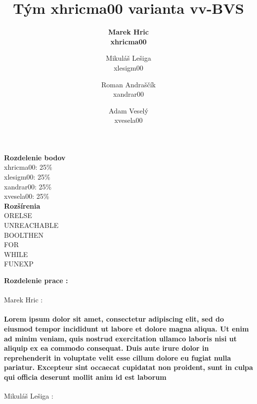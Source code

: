 \documentclass[12pt]{article}
\begin{document}
 
 
\title{\Huge \textbf{Tým xhricma00 varianta vv-BVS}}

\author{\bf Marek Hric \\
\bf xhricma00
\and Mikuláš Lešiga\\
 xlesigm00
\and Roman Andraščík \\
 xandrar00
\and Adam Veselý \\ 
xvesela00
}

\maketitle
\bigskip
\begin{center}
 \Large \textbf{Rozdelenie bodov}  \normalsize
 \\ 
\medskip
xhricma00: 25\% \\
xlesigm00: 25\% \\
xandrar00: 25\% \\
xvesela00: 25\%  \\
\bigskip
 \Large \textbf{Rozšírenia} \normalsize
\\
\medskip
ORELSE\\
UNREACHABLE\\
BOOLTHEN\\
FOR\\
WHILE\\
FUNEXP\\
\end{center}

\newpage

\noindent \Large \textbf{Rozdelenie prace :} \\
\noindent\makebox[\linewidth]{\rule{\textwidth}{0.4pt}}
\newline \\
\indent \large Marek Hric : \normalsize
\paragraph{Lorem ipsum dolor sit amet, consectetur adipiscing elit, sed do eiusmod tempor incididunt ut labore et dolore magna aliqua. Ut enim ad minim veniam, quis nostrud exercitation ullamco laboris nisi ut aliquip ex ea commodo consequat. Duis aute irure dolor in reprehenderit in voluptate velit esse cillum dolore eu fugiat nulla pariatur. Excepteur sint occaecat cupidatat non proident, sunt in culpa qui officia deserunt mollit anim id est laborum \newline \\} 
\large Mikuláš Lešiga :
\normalsize
\end{document}
